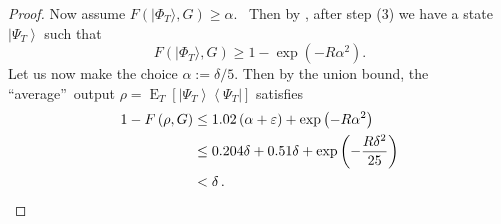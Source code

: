 \begin{proof}
Now assume $F(\vert \Phi_{T}\rangle ,G)  \geq\alpha$.
\ Then by , after step (3) we have a state $\left\vert
\Psi_{T}\right\rangle $ such that%
\[
F(\vert \Phi_{T}\rangle ,G)  \geq1-\exp\left(
-R\alpha^{2}\right)  .
\]
Let us now make the choice $\alpha:=\delta/5$. Then by the union bound, the
\textquotedblleft average\textquotedblright\ output $\rho=\operatorname*{E}%
_{T}\left[  \left\vert \Psi_{T}\right\rangle \left\langle \Psi_{T}\right\vert
\right]  $ satisfies%
\begin{align*}
1-F\left(  \rho,G\right)   &  \leq1.02\left(  \alpha+\varepsilon\right)
+\exp\left(  -R\alpha^{2}\right) \\
&  \leq0.204\delta+0.51\delta+\exp\left(  -\frac{R\delta^{2}}{25}\right) \\
&  <\delta\,.\qedhere
\end{align*}
\end{proof}

